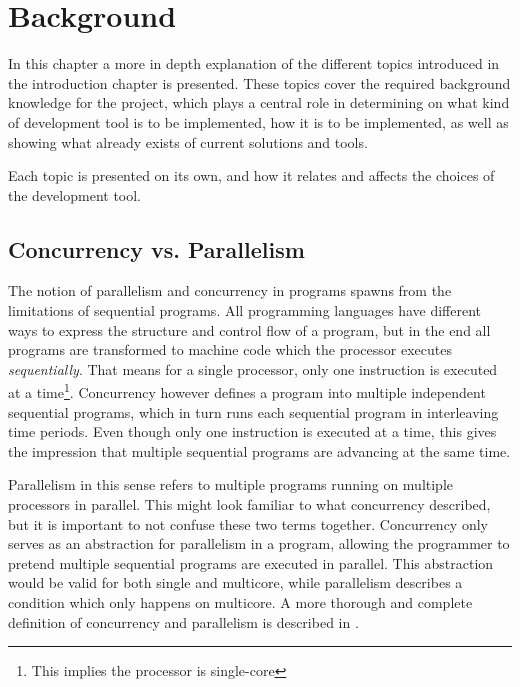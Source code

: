 
\chapter{Background}
\label{ch:background}

In this chapter a more in depth explanation of the different topics introduced in the introduction chapter is presented. These topics cover the required background knowledge for the project, which plays a central role in determining on what kind of development tool is to be implemented, how it is to be implemented, as well as showing what already exists of current solutions and tools.

Each topic is presented on its own, and how it relates and affects the choices of the development tool.


\section{Concurrency vs. Parallelism}
\label{sec:concurrency_vs_parallelism}

The notion of parallelism and concurrency in programs spawns from the limitations of sequential programs. All programming languages have different ways to express the structure and control flow of a program, but in the end all programs are transformed to machine code which the processor executes \textit{sequentially}. That means for a single processor, only one instruction is executed at a time\footnote{This implies the processor is single-core}. Concurrency however defines a program into multiple independent sequential programs, which in turn runs each sequential program in interleaving time periods. Even though only one instruction is executed at a time, this gives the impression that multiple sequential programs are advancing at the same time.

Parallelism in this sense refers to multiple programs running on multiple processors in parallel. This might look familiar to what concurrency described, but it is important to not confuse these two terms together. Concurrency only serves as an abstraction for parallelism in a program, allowing the programmer to pretend multiple sequential programs are executed in parallel. This abstraction would be valid for both single and multicore, while parallelism describes a condition which only happens on multicore. A more thorough and complete definition of concurrency and parallelism is described in \citet{benari2006}.

